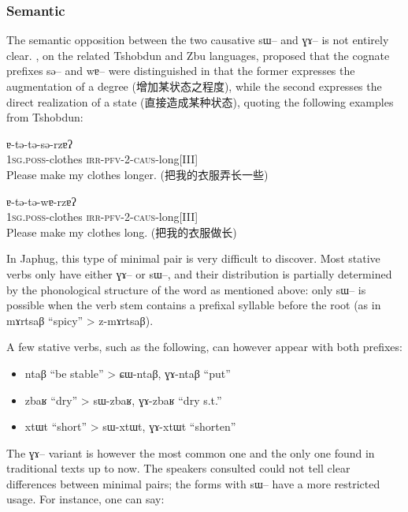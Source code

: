 \documentclass[oldfontcommands,oneside,a4paper,11pt]{memoir}
\newcommand{\ipa}[1]{{\phon #1}} %
\newcommand{\zh}[1]{{\cn #1}}
\newcommand{\caus}{\textsc{caus}}
\newcommand{\irr}{\textsc{irr}}
\newcommand{\pfv}{\textsc{pfv}}
\newcommand{\poss}{\textsc{poss}}
\newcommand{\sg}{\textsc{sg}}
\begin{document}
\subsubsection{Semantic} \label{subsub:caus-g:semantics}
The semantic opposition between the two causative \ipa{sɯ}-- and \ipa{ɣɤ}-- is not entirely clear. \citet{jackson06paisheng}, on the related Tshobdun and Zbu languages, proposed that the cognate prefixes \ipa{sə}-- and \ipa{wɐ}-- were distinguished in that the former expresses the \ipa{augmentation of a degree} (\zh{增加某状态之程度}), while the second expresses the \ipa{direct realization of a state}  (\zh{直接造成某种状态}), quoting the following examples from Tshobdun:
 \begin{exe}
\ex 
\gll  \ipa{ɐ́-ⁿge}  \ipa{ɐ-tə-tə-sə-rzɐʔ} \\
   1\sg{}.\poss{}-clothes \irr{}-\pfv{}-2-\caus{}-long[III] \\
 \glt    Please make my clothes longer. (\zh{把我的衣服弄长一些})
  \begin{exe}
   \end{exe}
   \ex 
\gll  \ipa{ɐ́-ⁿge}  \ipa{ɐ-tə-tə-wɐ-rzɐʔ} \\
     1\sg{}.\poss{}-clothes \irr{}-\pfv{}-2-\caus{}-long[III] \\
 \glt    Please make my clothes long. (\zh{把我的衣服做长})
   \end{exe}

In Japhug, this type of minimal pair is very difficult to discover. Most stative verbs only have either \ipa{ɣɤ}-- or \ipa{sɯ}--, and their distribution is partially determined by the phonological structure of the word as mentioned above: only \ipa{sɯ}-- is possible when the verb stem contains a prefixal syllable before the root (as in \ipa{mɤrtsaβ} ``spicy'' >  \ipa{z-mɤrtsaβ}). 

A few stative verbs, such as the following, can however appear with both prefixes:
\begin{itemize}
\item \ipa{ntaβ} ``be stable'' > \ipa{ɕɯ-ntaβ}, \ipa{ɣɤ-ntaβ} ``put''
\item \ipa{zbaʁ} ``dry'' > \ipa{sɯ-zbaʁ}, \ipa{ɣɤ-zbaʁ} ``dry s.t.''
\item \ipa{xtɯt} ``short'' > \ipa{sɯ-xtɯt}, \ipa{ɣɤ-xtɯt} ``shorten''
\end{itemize}
The \ipa{ɣɤ}-- variant is however  the most common one and the only one found in traditional texts up to now. The speakers consulted could not tell  clear differences between minimal pairs; the forms with \ipa{sɯ}-- have a more restricted usage. For instance, one can say:
\end{document}
